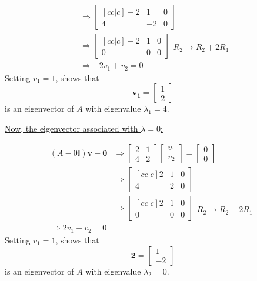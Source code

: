 \documentclass[11pt]{article}
\newcommand{\ident}{\mathbb{I}}
\renewcommand{\vec}[1]{\mathbf{#1}}
\begin{document}
\begin{align*}
&\Rightarrow \begin{bmatrix}[cc|c]
-2 & 1 & 0 \\
4 & -2 & 0
\end{bmatrix} \\
&\Rightarrow \begin{bmatrix}[cc|c]
-2 & 1 & 0 \\
0 & 0 & 0
\end{bmatrix}
\begin{matrix}
\\
R_2 \rightarrow R_2 + 2R_1
\end{matrix} \\
&\Rightarrow -2v_1 + v_2 = 0
\end{align*}
Setting $v_1 = 1$, shows that
\[ \vec{v_1} = \begin{bmatrix}
1 \\
2
\end{bmatrix} \]
is an eigenvector of $A$ with eigenvalue $\lambda_1 = 4$.

\underline{Now, the eigenvector associated with $\lambda = 0$:}

\begin{align*}
(A - 0 \ident) \vec{v} - \vec{0} &\Rightarrow \begin{bmatrix}
2 & 1 \\
4 & 2
\end{bmatrix}
\begin{bmatrix}
v_1 \\
v_2
\end{bmatrix}
= \begin{bmatrix}
0 \\
0
\end{bmatrix} \\
&\Rightarrow \begin{bmatrix}[cc|c]
2 & 1 & 0 \\
4 & 2 & 0
\end{bmatrix} \\
&\Rightarrow \begin{bmatrix}[cc|c]
2 & 1 & 0 \\
0 & 0 & 0
\end{bmatrix}
\begin{matrix}
\\
R_2 \rightarrow R_2 - 2R_1
\end{matrix} \\
\Rightarrow 2v_1 + v_2 = 0
\end{align*}
Setting $v_1 = 1$, shows that
\[ \vec{2} = \begin{bmatrix}
1 \\
-2
\end{bmatrix}
\]
is an eigenvector of $A$ with eigenvalue $\lambda_2 = 0$.
\end{document}
